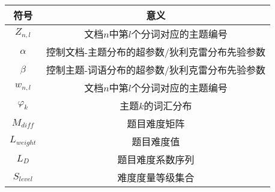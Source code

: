 \begin{table}[]
    \centering
    \begin{tabular}{cc}
    \hline
    符号            & 意义                       \\ \hline

    $Z_{n,l}$     & 文档$n$中第$l$个分词对应的主题编号     \\
    $\alpha$      & 控制文档-主题分布的超参数/狄利克雷分布先验参数 \\
    $\beta$       & 控制主题-词语分布的超参数/狄利克雷分布先验参数 \\
    $w_{n,l}$     & 文档$n$中第$l$个分词对应的主题编号     \\
    $\varphi_{k}$ & 主题$k$的词汇分布               \\
    $M_{diff}$    & 题目难度矩阵                   \\
    $L_{weight}$  & 题目难度值                    \\
    $L_D$         & 题目难度系数序列                 \\
    $S_{level}$   & 难度度量等级集合                 \\ \hline
    \end{tabular}
\end{table}